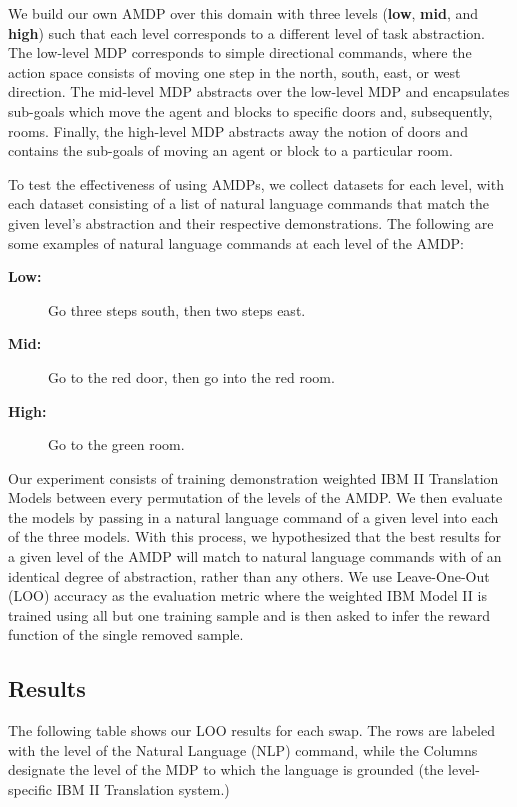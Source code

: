 \documentclass[conference]{IEEEtran}
\begin{document}
We build our own AMDP over this domain with three levels (\textbf{low}, \textbf{mid}, and \textbf{high}) such that each level corresponds to a different level of task abstraction. The low-level MDP corresponds to simple directional commands, where the action space consists of moving one step in the north, south, east, or west direction. The mid-level MDP abstracts over the low-level MDP and encapsulates sub-goals which move the agent and blocks to specific doors and, subsequently, rooms. Finally, the high-level MDP abstracts away the notion of doors and contains the sub-goals of moving an agent or block to a particular room.

To test the effectiveness of using AMDPs, we collect datasets for each level, with each dataset consisting of a list of natural language commands that match the given level's abstraction and their respective demonstrations. The following are some examples of natural language commands at each level of the AMDP:

\begin{description}
\item[\textbf{Low:}] Go three steps south, then two steps east.
\item[\textbf{Mid:}] Go to the red door, then go into the red room.
\item[\textbf{High:}] Go to the green room.
\end{description}

Our experiment consists of training demonstration weighted IBM II Translation Models between every permutation of the levels of the AMDP. We then evaluate the models by passing in a natural language command of a given level into each of the three models. With this process, we hypothesized that the best results for a given level of the AMDP will match to natural language commands with of an identical degree of abstraction, rather than any others. We use Leave-One-Out (LOO) accuracy as the evaluation metric where the weighted IBM Model II is trained using all but one training sample and is then asked to infer the reward function of the single removed sample.

\subsection{Results}

The following table shows our LOO results for each swap. The rows are labeled with the level of the Natural Language (NLP) command, while the Columns designate the level of the MDP to which the language is grounded (the level-specific IBM II Translation system.)
\end{document}
